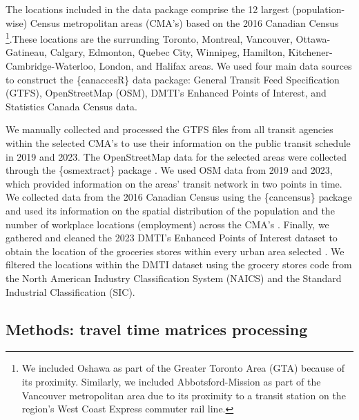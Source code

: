 \documentclass[Royal,times,sageh]{sagej}
\begin{document}
The locations included in the data package comprise the 12 largest
(population-wise) Census metropolitan areas (CMA's) based on the 2016
Canadian Census \citep{governmentofcanada2016CensusPopulation2016}
\footnote{We included Oshawa as part of the Greater Toronto Area (GTA)
  because of its proximity. Similarly, we included Abbotsford-Mission as
  part of the Vancouver metropolitan area due to its proximity to a
  transit station on the region's West Coast Express commuter rail line.}.These
locations are the surrunding Toronto, Montreal, Vancouver,
Ottawa-Gatineau, Calgary, Edmonton, Quebec City, Winnipeg, Hamilton,
Kitchener-Cambridge-Waterloo, London, and Halifax areas. We used four
main data sources to construct the \{canaccesR\} data package: General
Transit Feed Specification (GTFS), OpenStreetMap (OSM), DMTI's Enhanced
Points of Interest, and Statistics Canada Census data.

We manually collected and processed the GTFS files from all transit
agencies within the selected CMA's to use their information on the
public transit schedule in 2019 and 2023. The OpenStreetMap data for the
selected areas were collected through the \{osmextract\} package
\citep{gilardiOsmextractDownloadImport2025}. We used OSM data from 2019
and 2023, which provided information on the areas' transit network in
two points in time. We collected data from the 2016 Canadian Census
using the \{cancensus\} package
\citep{vonbergmannCancensusPackageAccess2022} and used its information
on the spatial distribution of the population and the number of
workplace locations (employment) across the CMA's
\citep{governmentofcanada2016CensusPopulation2016}. Finally, we gathered
and cleaned the 2023 DMTI's Enhanced Points of Interest dataset to
obtain the location of the groceries stores within every urban area
selected \citep{dmtispatialincEnhancedPointsInterest2015}. We filtered
the locations within the DMTI dataset using the grocery stores code from
the North American Industry Classification System (NAICS) and the
Standard Industrial Classification (SIC).

\subsection{Methods: travel time matrices
processing}\label{methods-travel-time-matrices-processing}
\end{document}
